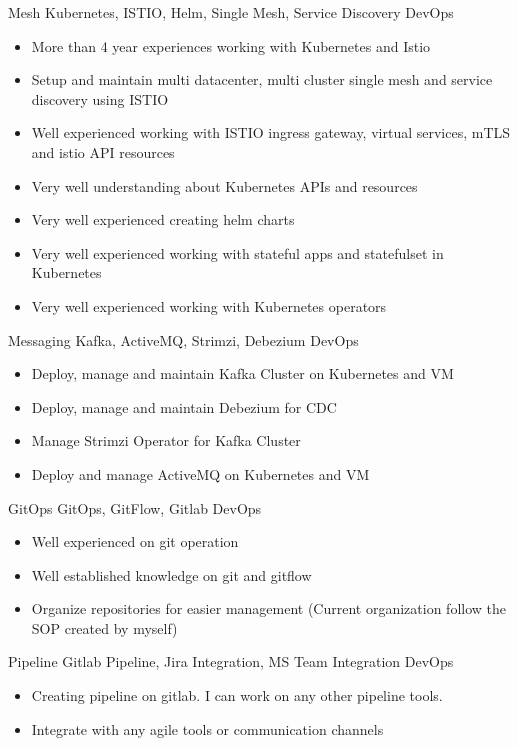 \documentclass[]{friggeri-cv}
\begin{document}
\begin{entrylist}
  \entry
  {Mesh}
  {Kubernetes, ISTIO, Helm, Single Mesh, Service Discovery}
  {DevOps}
  {  \begin{itemize}
      \item More than 4 year experiences working with Kubernetes and Istio
      \item Setup and maintain multi datacenter, multi cluster single mesh and service discovery using ISTIO
      \item Well experienced working with ISTIO ingress gateway, virtual services, mTLS and istio API resources
      \item Very well understanding about Kubernetes APIs and resources
      \item Very well experienced creating helm charts
      \item Very well experienced working with stateful apps and statefulset in Kubernetes
      \item Very well experienced working with Kubernetes operators
    \end{itemize}}
  \entry
  {Messaging}
  {Kafka, ActiveMQ, Strimzi, Debezium}
  {DevOps}
  { \begin{itemize}
      \item Deploy, manage and maintain Kafka Cluster on Kubernetes and VM
      \item Deploy, manage and maintain Debezium for CDC
      \item Manage Strimzi Operator for Kafka Cluster
      \item Deploy and manage ActiveMQ on Kubernetes and VM
    \end{itemize}}
  \entry
  {GitOps}
  {GitOps, GitFlow, Gitlab}
  {DevOps}
  { \begin{itemize}
      \item Well experienced on git operation
      \item Well established knowledge on git and gitflow
      \item Organize repositories for easier management (Current organization follow the SOP created by myself)
    \end{itemize}}
  \entry
  {Pipeline}
  {Gitlab Pipeline, Jira Integration, MS Team Integration}
  {DevOps}
  { \begin{itemize}
      \item Creating pipeline on gitlab. I can work on any other pipeline tools.
      \item Integrate with any agile tools or communication channels

\end{itemize}}
\end{entrylist}
\end{document}
